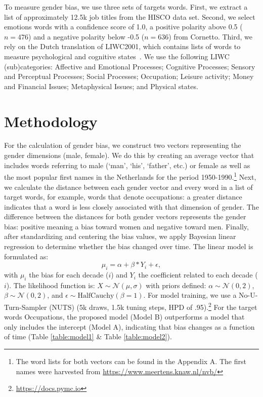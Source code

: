 \documentclass[11pt,a4paper]{article}
\begin{document}

To measure gender bias, we use three sets of targets words. First, we extract a list of approximately 12.5k job titles from the HISCO data set. Second, we select emotions words with a confidence score of 1.0, a positive polarity above 0.5 ($n = 476$) and a negative polarity below -0.5 ($n = 636$) from Cornetto. Third, we rely on the Dutch translation of LIWC2001, which contains lists of words to measure psychological and cognitive states~\cite{pennebaker2001linguistic}. We use the following LIWC (sub)categories: Affective and Emotional Processes; Cognitive Processes; Sensory and Perceptual Processes; Social Processes; Occupation; Leisure activity; Money and Financial Issues; Metaphysical Issues; and Physical states.

\section{Methodology}
For the calculation of gender bias, we construct two vectors representing the gender dimensions (male, female). We do this by creating an average vector that includes words referring to male (`man', `his', `father', etc.) or female as well as the most popular first names in the Netherlands for the period 1950-1990.\footnote{The word lists for both vectors can be found in the Appendix A. The first names were harvested from \url{https://www.meertens.knaw.nl/nvb/}}
Next, we calculate the distance between each gender vector and every word in a list of target words, for example, words that denote occupations: a greater distance indicates that a word is less closely associated with that dimension of gender. The difference between the distances for both gender vectors represents the gender bias: positive meaning a bias toward women and negative toward men. 
Finally, after standardizing and centering the bias values, we apply Bayesian linear regression to determine whether the bias changed over time. The linear model is formulated as:
\[\mu_i = \alpha + \beta * Y_{i} + \epsilon,\]
with $\mu_{i}$ the bias for each decade ($i$) and $Y_{i}$ the coefficient related to each decade ($i$). The likelihood function is: $X \sim \mathcal{N}(\mu, \sigma)$ with priors defined: $\alpha \sim \mathcal{N}(0, 2)$, $\beta \sim \mathcal{N}(0, 2)$, and $\epsilon \sim \mathrm{HalfCauchy}(\beta = 1)$. For model training, we use a No-U-Turn-Sampler (NUTS) (5k draws, 1.5k tuning steps, HPD of .95).\footnote{\url{https://docs.pymc.io}} For the target words Occupations, the proposed model (Model B) outperforms a model that only includes the intercept (Model A), indicating that bias changes as a function of time (Table \ref{table:model1} \& Table \ref{table:model2}). 
\end{document}
